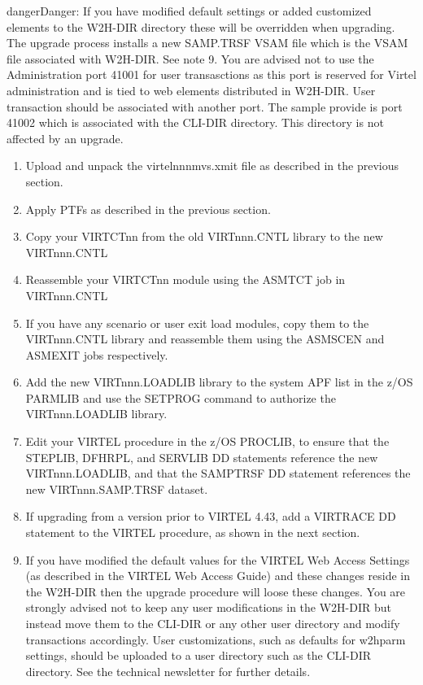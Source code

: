 \documentclass[letterpaper,10pt,english]{sphinxmanual}
\begin{document}
\begin{sphinxadmonition}{danger}{Danger:}
If you have modified default settings or added customized elements to the W2H-DIR directory these will be overridden when upgrading. The upgrade process installs a new SAMP.TRSF VSAM file which is the VSAM file associated with W2H-DIR. See note 9. You are advised not to use the Administration port 41001 for user transasctions as this port is reserved for Virtel administration and is tied to web elements distributed in W2H-DIR. User transaction should be associated with another port. The sample provide is port 41002 which is associated with the CLI-DIR directory. This directory is not affected by an upgrade.
\end{sphinxadmonition}
\begin{enumerate}
\item {} 
Upload and unpack the virtelnnnmvs.xmit file as described in the previous section.

\item {} 
Apply PTFs as described in the previous section.

\item {} 
Copy your VIRTCTnn from the old VIRTnnn.CNTL library to the new VIRTnnn.CNTL

\item {} 
Reassemble your VIRTCTnn module using the ASMTCT job in VIRTnnn.CNTL

\item {} 
If you have any scenario or user exit load modules, copy them to the VIRTnnn.CNTL library and reassemble them using the ASMSCEN and ASMEXIT jobs respectively.

\item {} 
Add the new VIRTnnn.LOADLIB library to the system APF list in the z/OS PARMLIB and use the SETPROG command to authorize the VIRTnnn.LOADLIB library.

\item {} 
Edit your VIRTEL procedure in the z/OS PROCLIB, to ensure that the STEPLIB, DFHRPL, and SERVLIB DD statements reference the new VIRTnnn.LOADLIB, and that the SAMPTRSF DD statement references the new VIRTnnn.SAMP.TRSF dataset.

\item {} 
If upgrading from a version prior to VIRTEL 4.43, add a VIRTRACE DD statement to the VIRTEL procedure, as shown in the next section.

\item {} 
If you have modified the default values for the VIRTEL Web Access Settings (as described in the VIRTEL Web Access Guide) and these changes reside in the W2H-DIR then the upgrade procedure will loose these changes. You are strongly advised not to keep any user modifications in the W2H-DIR but instead move them to the CLI-DIR or any other user directory and modify transactions accordingly. User customizations, such as defaults for w2hparm settings, should be uploaded to a user directory such as the CLI-DIR directory. See the technical newsletter  for further details.


\end{enumerate}
\end{document}

